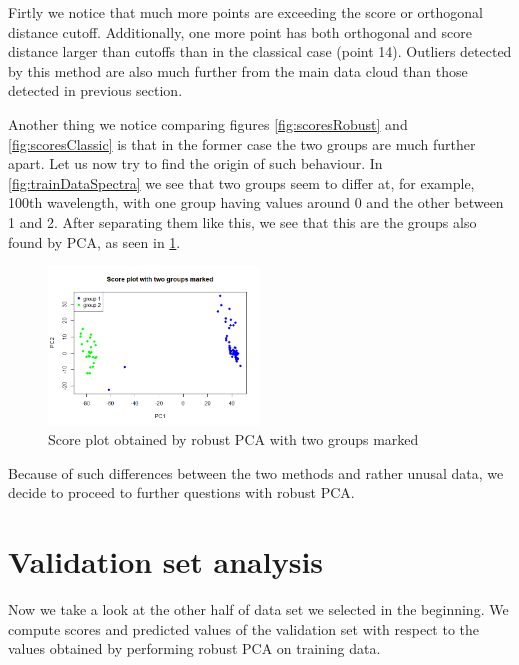 \documentclass[12pt]{article}
\begin{document}
Firtly we notice that much more points are exceeding the score or orthogonal distance cutoff. 
Additionally, one more point has both orthogonal and score distance larger than cutoffs than in the classical case (point 14). Outliers detected by this method
are also much further from the main data cloud than those detected in previous section.

Another thing we notice comparing figures \ref{fig:scoresRobust} and \ref{fig:scoresClassic} is that in the former case the two groups are much further apart. Let us
now try to find the origin of such behaviour. In \ref{fig:trainDataSpectra} we see that two groups seem to differ at, for example, 100th wavelength, with one group having
values around 0 and the other between 1 and 2. After separating them like this, we see that this are the groups also found by PCA, as seen in \ref{fig:twoGroupScore}.

\begin{figure}
  \begin{center}
    \centering
      \includegraphics[width=0.5\textwidth]{../images/twoGroupScore.png}
      \caption{Score plot obtained by robust PCA with two groups marked}
      \label{fig:twoGroupScore}
  \end{center}
\end{figure}

Because of such differences between the two methods and rather unusal data, we decide to proceed to further questions with robust PCA.

\section{Validation set analysis}
Now we take a look at the other half of data set we selected in the beginning. We compute scores and
predicted values of the validation set with respect to the values obtained by performing robust PCA on training data.
\end{document}
